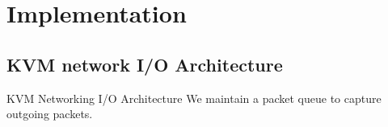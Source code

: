  \section{Implementation} \label{sec:impl}

\subsection{KVM network I/O Architecture}\label{sec:architecture}
KVM Networking I/O Architecture
We maintain a packet queue to capture outgoing packets.
